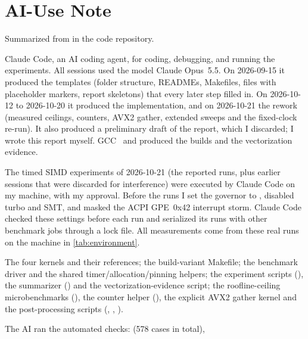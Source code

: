 \section{AI-Use Note}\label{sec:ai-use}

Summarized from  in the code repository.

\begin{description}[style=nextline]
  \item[Tools used] Claude Code, an AI coding agent, for coding, debugging, and running the experiments.
        All sessions used the model Claude Opus~5.5. On
        2026-09-15 it produced the templates (folder structure, READMEs, Makefiles,
        files with placeholder markers, report skeletons) that every later step filled in. On 2026-10-12 to
        2026-10-20 it produced the implementation, and on 2026-10-21 the rework (measured ceilings,
        counters, AVX2 gather, extended sweeps and the fixed-clock re-run). It also produced a
        preliminary draft of the report, which I discarded; I wrote this report myself.
        GCC~\sysGCC{} and  produced the builds and the vectorization evidence.
  \item[Who ran the measurements] The timed SIMD experiments of 2026-10-21 (the reported runs, plus earlier sessions that
        were discarded for interference) were executed by Claude
        Code on my machine, with my approval. Before the runs I set the
        governor to , disabled turbo and SMT, and masked the ACPI GPE~0x42
        interrupt storm. Claude Code checked these settings before each run and serialized its runs with
        other benchmark jobs through a lock file. All measurements come from these real runs on
        the machine in \cref{tab:environment}.
  \item[What they helped generate] The four kernels and their references; the build-variant
        Makefile; the benchmark driver and the shared timer/allocation/pinning helpers; the
        experiment scripts (), the summarizer () and the
        vectorization-evidence script; the roofline-ceiling microbenchmarks
        (), the  counter helper (), the
        explicit AVX2 gather kernel and the post-processing scripts (,
        , ).
  \item[Who verified what] The AI ran the automated checks:  (\num{578} cases in total),

\end{description}
